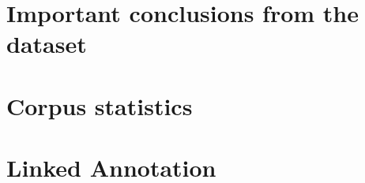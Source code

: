 \section{Important conclusions from the dataset}


\section{Corpus statistics}


\section{Linked Annotation}

